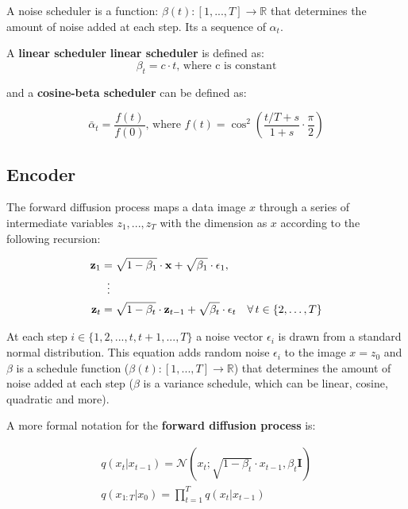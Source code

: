 A noise scheduler is a function: $\beta(t):[1, ..., T] \rightarrow \mathbb{R}$ that determines the amount of noise added at each step. Its a sequence of $\alpha_t$.

A \textbf{linear scheduler} \textbf{linear scheduler} is defined as:
\[
    \beta_t = c \cdot t \text{, where c is constant}
\]

and a \textbf{cosine-beta scheduler} can be defined as:

\[
    \bar{\alpha}_t = \frac{f(t)}{f(0)} \text{, where } f(t) = \cos^2 \left( \frac{t/T + s}{1+s} \cdot \frac{\pi}{2} \right)
\]








\subsection{Encoder}

The forward diffusion process maps a data image $x$ through a series of intermediate variables $z_1, ..., z_T$ with the dimension as $x$ according to the following recursion:

\begin{equation}
    \begin{aligned}
    \mathbf{z}_1 &= \sqrt{1 - \beta_1} \cdot \mathbf{x} + \sqrt{\beta_1} \cdot \epsilon_1, \\
    &\;\;\vdots \notag \\
    \mathbf{z}_t &= \sqrt{1 - \beta_t} \cdot \mathbf{z}_{t-1} + \sqrt{\beta_t} \cdot \epsilon_t \quad \forall \, t \in \{2, \ldots, T\}
    \end{aligned}
\end{equation}

At each step $i \in \{1, 2, ..., t, t+1, ..., T\}$ a noise vector $\epsilon_i$ is drawn from a standard normal distribution. This equation adds random noise $\epsilon_i$ to the image $x = z_0$ and $\beta$ is a schedule function ($\beta(t):[1, ..., T] \rightarrow \mathbb{R}$) that determines the amount of noise added at each step ($\beta$ is a variance schedule, which can be linear, cosine, quadratic and more). 

A more formal notation for the \textbf{forward diffusion process} is:

\begin{equation*}
    \begin{aligned}
        q(x_t | x_{t-1}) = \mathcal{N}(x_t; \sqrt{1-\beta_t} \cdot x_{t-1}, \beta_t \mathbf{I}) \\
        q(x_{1:T} | x_0) = \prod_{t=1}^{T} q(x_t | x_{t-1})
    \end{aligned}
\end{equation*}

